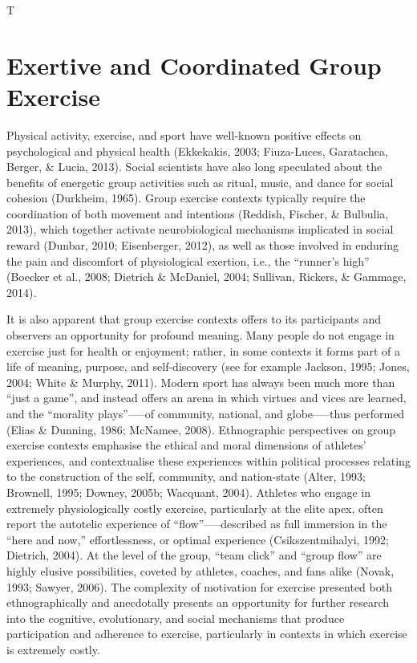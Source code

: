 T











\section{Exertive and Coordinated Group Exercise}
Physical activity, exercise, and sport have well-known positive effects on psychological and physical health (Ekkekakis, 2003; Fiuza-Luces, Garatachea, Berger, \& Lucia, 2013).
Social scientists have also long speculated about the benefits of energetic group activities such as ritual, music, and dance for social cohesion (Durkheim, 1965).  Group exercise contexts typically require the coordination of both movement and intentions (Reddish, Fischer, \& Bulbulia, 2013), which together activate neurobiological mechanisms implicated in social reward (Dunbar, 2010; Eisenberger, 2012), as well as those involved in enduring the pain and discomfort of physiological exertion, i.e., the ``runner’s high'' (Boecker et al., 2008; Dietrich \& McDaniel, 2004; Sullivan, Rickers, \& Gammage, 2014).


It is also apparent that group exercise contexts offers to its participants and observers an opportunity for profound meaning.  Many people do not engage in exercise just for health or enjoyment; rather, in some contexts it forms part of a life of meaning, purpose, and self-discovery (see for example Jackson, 1995; Jones, 2004; White \& Murphy, 2011). Modern sport has always been much more than ``just a game'', and instead offers an arena in which virtues and vices are learned, and the ``morality plays''—--of community, national, and globe—--thus performed (Elias \& Dunning, 1986; McNamee, 2008).  Ethnographic perspectives on group exercise contexts emphasise the ethical and moral dimensions of athletes’ experiences, and contextualise these experiences within political processes relating to the construction of the self, community, and nation-state (Alter, 1993; Brownell, 1995; Downey, 2005b; Wacquant, 2004).  Athletes who engage in extremely physiologically costly exercise, particularly at the elite apex, often report the autotelic experience of ``flow''—--described as full immersion in the ``here and now,'' effortlessness, or optimal experience (Csikszentmihalyi, 1992; Dietrich, 2004).  At the level of the group, ``team click'' and ``group flow'' are highly elusive possibilities, coveted by athletes, coaches, and fans alike (Novak, 1993; Sawyer, 2006).  The complexity of motivation for exercise presented both ethnographically and anecdotally presents an opportunity for further research into the cognitive, evolutionary, and social mechanisms that produce participation and adherence to exercise, particularly in contexts in which exercise is extremely costly.


